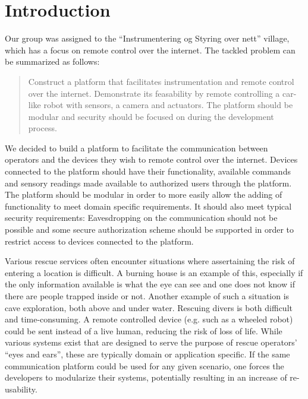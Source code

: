 \chapter{Introduction}
Our group was assigned to the ``Instrumentering og Styring over nett'' village, which has a focus on remote control over the internet.
The tackled problem can be summarized as follows:
\begin{quote}
Construct a platform that facilitates instrumentation and remote control over the internet.
Demonstrate its feasability by remote controlling a car-like robot with sensors, a camera and actuators.
The platform should be modular and security should be focused on during the development process.
\end{quote}

We decided to build a platform to facilitate the communication between operators and the devices they wish to remote control over the internet.
Devices connected to the platform should have their functionality, available commands and sensory readings made available to authorized users through the platform.
The platform should be modular in order to more easily allow the adding of functionality to meet domain specific requirements.
It should also meet typical security requirements: Eavesdropping on the communication should not be possible and some secure authorization scheme should be supported in order to restrict access to devices connected to the platform.

Various rescue services often encounter situations where assertaining the risk of entering a location is difficult. A burning house is an example of this, especially if the only information available is what the eye can see and one does not know if there are people trapped inside or not.
Another example of such a situation is cave exploration, both above and under water.
Rescuing divers is both difficult and time-consuming.  %
A remote controlled device (e.g. such as a wheeled robot) could be sent instead of a live human, reducing the risk of loss of life.
While various systems exist that are designed to serve the purpose of rescue operators' ``eyes and ears'', these are typically domain or application specific.
If the same communication platform could be used for any given scenario, one forces the developers to modularize their systems, potentially resulting in an increase of re-usability.

